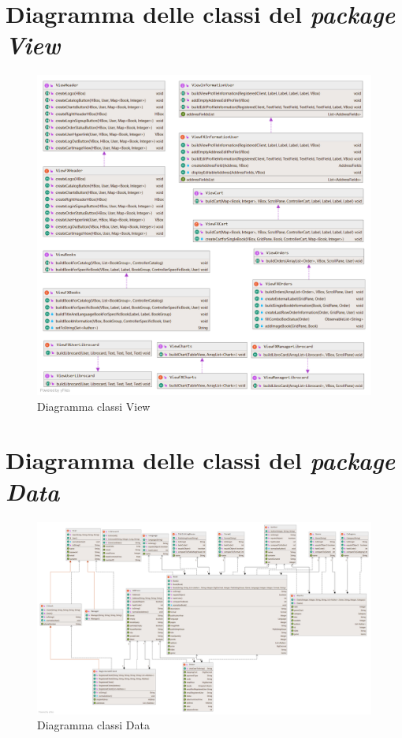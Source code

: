 \documentclass[a4paper,11pt]{report}
\begin{document}
\section{Diagramma delle classi del \textit{package View}}
\begin{figure}[h!]
	\centering
	\hspace*{-0.6in}
	\includegraphics[width=1.3\linewidth]{Class diagrams/Package View.png}
	\caption{Diagramma classi View}
\end{figure}

\clearpage

\section{Diagramma delle classi del \textit{package Data}}
\begin{figure}[h!]
	\centering
	\hspace*{-0.8in}
	\includegraphics[width=1.3\linewidth]{Class diagrams/Package Data.png}
	\caption{Diagramma classi Data}
\end{figure}
\end{document}

